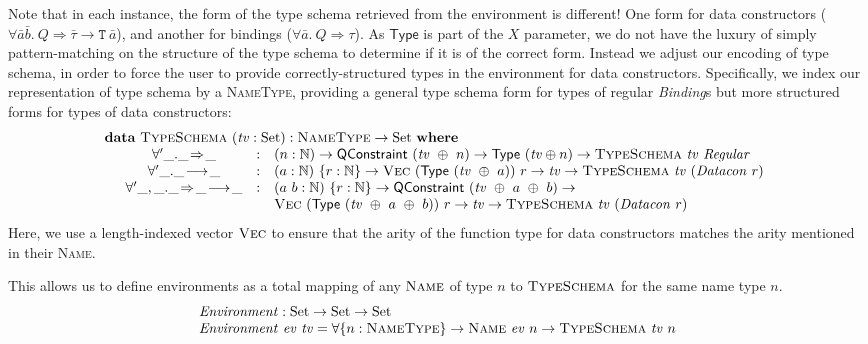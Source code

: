 \documentclass[a4paper]{jfp}
\begin{document}
Note that in each instance, the form of the type schema retrieved from the environment is different! One form for  data constructors ($ \forall
\bar{a}\bar{b}.\ Q \Rightarrow \bar{\tau} \rightarrow  \mathtt{T}\ \bar{a}$), and another for bindings ($\forall\bar{a}.\ Q \Rightarrow
\tau$). As $\textsf{Type}$ is part of the $X$ parameter, we do not have the luxury of simply pattern-matching on the structure of the type schema to
determine if it is of the correct form. Instead we adjust our encoding of type schema, in order to force the user to provide correctly-structured
types in the environment for data constructors. Specifically, we index our representation of type schema by a \textsc{NameType}, providing a general
type schema form for types of regular \textit{Binding}s but more structured forms for types of data constructors:
\begin{displaymath}
   \begin{array}{l}
   \textbf{data}\ \textsc{TypeSchema}\ (\mathit{tv} : \text{Set}) : \textsc{NameType} \rightarrow \text{Set}\ \textbf{where} \\
   \quad\begin{array}{cll}
      \forall'\_.\_\!\Rightarrow\!\_ & : & (n : \mathbb{N}) \rightarrow \textsf{QConstraint}\ (\mathit{tv}\ \oplus\ n) \rightarrow \textsf{Type}\
      (\mathit{tv} \oplus n) \rightarrow \textsc{TypeSchema}\ \mathit{tv}\ \mathit{Regular} \\
      \forall'\_.\_\!\longrightarrow\!\_ & : & (a : \mathbb{N})\ \{r : \mathbb{N}\} \rightarrow \textsc{Vec}\ (\textsf{Type}\ (\mathit{tv}\ \oplus\ a))\ r
\rightarrow \mathit{tv} \rightarrow \textsc{TypeSchema}\ \mathit{tv}\ (\mathit{Datacon}\ r) \\
      \forall'\_,\_.\_\!\Rightarrow\!\_\!\longrightarrow\!\_ & : & (a\ b : \mathbb{N})\ \{r : \mathbb{N}\} \rightarrow \textsf{QConstraint}\ (\mathit{tv}\ \oplus\ a\ \oplus\ b) 
                 \rightarrow \\ & & \textsc{Vec}\ (\textsf{Type}\ (\mathit{tv}\ \oplus\ a\ \oplus\ b))\ r \rightarrow \mathit{tv} \rightarrow
           \textsc{TypeSchema}\ \mathit{tv}\ (\mathit{Datacon}\ r)
    \end{array}
        \end{array}
\end{displaymath}
Here, we use a length-indexed vector $\textsc{Vec}$ to ensure that the arity of the function type for data constructors matches the arity mentioned in
their \textsc{Name}. 

This allows us to define environments as a total mapping of any $\textsc{Name}$ of type $n$ to $\textsc{TypeSchema}$ for the same name type $n$.
\begin{displaymath}
   \begin{array}{l}
   \mathit{Environment} : \text{Set} \rightarrow  \text{Set} \rightarrow \text{Set} \\
  \mathit{Environment}\ \mathit{ev}\ \mathit{tv} = \forall \{n : \textsc{NameType} \} \rightarrow \textsc{Name}\ \mathit{ev}\ n \rightarrow
  \textsc{TypeSchema}\ \mathit{tv}\ n 
        \end{array}
\end{displaymath}
\end{document}
